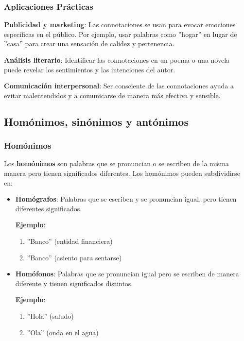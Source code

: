 \subsubsection{Aplicaciones Prácticas}

\textbf{Publicidad y marketing}: Las connotaciones se usan para evocar emociones específicas en el público. Por ejemplo, usar palabras como ''hogar'' en lugar de ''casa'' para crear una sensación de calidez y pertenencia.

\textbf{Análisis literario}: Identificar las connotaciones en un poema o una novela puede revelar los sentimientos y las intenciones del autor.

\textbf{Comunicación interpersonal}: Ser consciente de las connotaciones ayuda a evitar malentendidos y a comunicarse de manera más efectiva y sensible.

\subsection{Homónimos, sinónimos y antónimos}

\subsubsection{Homónimos}

Los \textbf{homónimos} son palabras que se pronuncian o se escriben de la misma manera pero tienen significados diferentes. Los homónimos pueden subdividirse en:

\begin{itemize}
      \item \textbf{Homógrafos}: Palabras que se escriben y se pronuncian igual, pero tienen diferentes significados.

            \textbf{Ejemplo}:
            \begin{enumerate}
                  \item ''Banco'' (entidad financiera)
                  \item ''Banco'' (asiento para sentarse)
            \end{enumerate}

      \item \textbf{Homófonos}: Palabras que se pronuncian igual pero se escriben de manera diferente y tienen significados distintos.

            \textbf{Ejemplo}:
            \begin{enumerate}
                  \item ''Hola'' (saludo)
                  \item ''Ola'' (onda en el agua)
            \end{enumerate}
\end{itemize}

